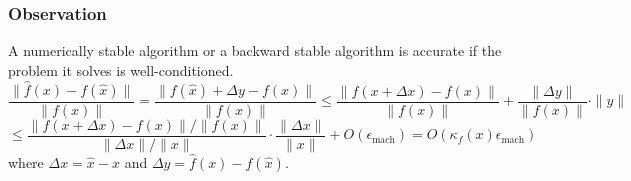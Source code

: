 \documentclass[11pt]{article}
\begin{document}
\subsubsection*{Observation}
A numerically stable algorithm or a backward stable algorithm is accurate if the problem it solves is well-conditioned.
\[\frac{\|\hat{f}(x) - f(\hat{x})\|}{\|f(x)\|} = \frac{\|f(\hat{x}) + \Delta y - f(x)\|}{\|f(x)\|} \leq \frac{\|f(x + \Delta x) - f(x)\|}{\|f(x)\|} + \frac{\|\Delta y\|}{\|f(x)\|} \cdot \|y\|\]
\[\leq \frac{\|f(x + \Delta x) - f(x)\| / \|f(x)\|}{\|\Delta x\| / \|x\|} \cdot \frac{\|\Delta x\|}{\|x\|} + O(\epsilon_{\text{mach}}) = O(\kappa_f(x) \epsilon_{\text{mach}})\]
where \( \Delta x = \hat{x} - x \) and \( \Delta y = \hat{f}(x) - f(\hat{x}) \).
\end{document}

